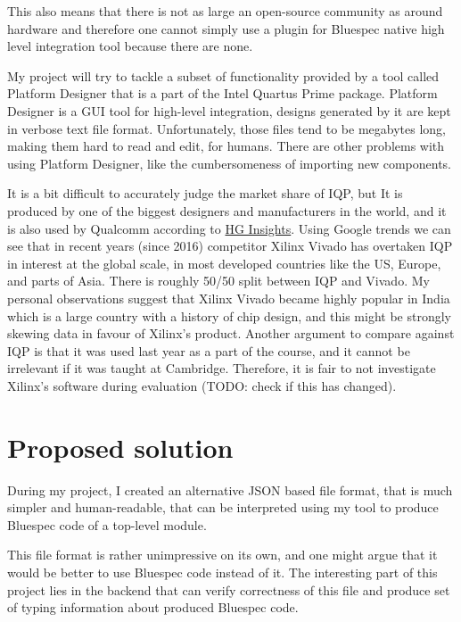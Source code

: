 \documentclass[12pt]{report}
\begin{document}
This also means that there is not as large an open-source community as around hardware and therefore one cannot simply use a plugin for Bluespec native high level integration tool because there are none. 

My project will try to tackle a subset of functionality provided by a tool called Platform Designer that is a part of the Intel Quartus Prime package. 
Platform Designer is a GUI tool for high-level integration, designs generated by it are kept in verbose text file format. Unfortunately, those files tend to be megabytes long, making them hard to read and edit, for humans. 
There are other problems with using Platform Designer, like the cumbersomeness of importing new components.

\begin{tcolorbox}[title=Market share and justification for focusing entirely on comparisons with Intel Quartus Prime]
    It is a bit difficult to accurately judge the market share of IQP, but It is produced by one of the biggest designers and manufacturers in the world, and it is also used by Qualcomm according to \href{https://discovery.hgdata.com/product/intel-quartus-prime}{HG Insights}. Using Google trends we can see that in recent years (since 2016) competitor Xilinx Vivado has overtaken IQP in interest at the global scale, in most developed countries like the US, Europe, and parts of Asia. There is roughly 50/50 split between IQP and Vivado. My personal observations suggest that Xilinx Vivado became highly popular in India which is a large country with a history of chip design, and this might be strongly skewing data in favour of Xilinx's product. Another argument to compare against IQP is that it was used last year as a part of the course, and it cannot be irrelevant if it was taught at Cambridge. Therefore, it is fair to not investigate Xilinx's software during evaluation (TODO: check if this has changed). 
\end{tcolorbox}

\section{Proposed solution}
During my project, I created an alternative JSON based file format, that is much simpler and human-readable, that can be interpreted using my tool to produce Bluespec code of a top-level module.  

This file format is rather unimpressive on its own, and one might argue that it would be better to use Bluespec code instead of it. The interesting part of this project lies in the backend that can verify correctness of this file and produce set of typing information about produced Bluespec code.  
\end{document}
